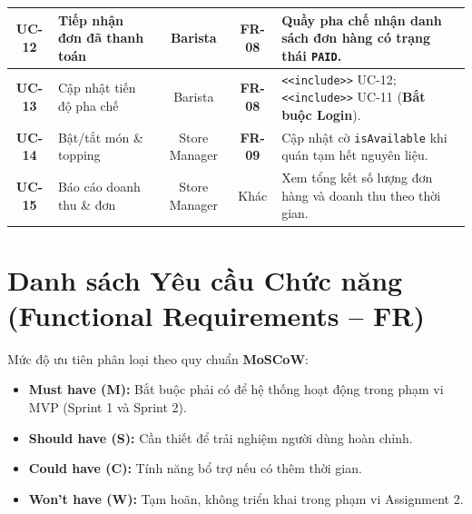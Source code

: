 \documentclass[12pt,a4paper]{article}
\begin{document}
\begin{table}[H]
\begin{tabularx}{\textwidth}{|c|>{\raggedright\arraybackslash}p{3.5cm}|c|c|>{\raggedright\arraybackslash}X|}
\hline
\textbf{UC-12} & Tiếp nhận đơn đã thanh toán & Barista & \textbf{FR-08} & Quầy pha chế nhận danh sách đơn hàng có trạng thái \texttt{PAID}. \\
\hline
\textbf{UC-13} & Cập nhật tiến độ pha chế & Barista & \textbf{FR-08} & \texttt{<<include>>} UC-12; \texttt{<<include>>} UC-11 (\textbf{Bắt buộc Login}). \\
\hline
\textbf{UC-14} & Bật/tắt món \& topping & Store Manager & \textbf{FR-09} & Cập nhật cờ \texttt{isAvailable} khi quán tạm hết nguyên liệu. \\
\hline
\textbf{UC-15} & Báo cáo doanh thu \& đơn & Store Manager & Khác & Xem tổng kết số lượng đơn hàng và doanh thu theo thời gian. \\
\hline
\end{tabularx}
\end{table}

\newpage

\section{Danh sách Yêu cầu Chức năng (Functional Requirements -- FR)}

Mức độ ưu tiên phân loại theo quy chuẩn \textbf{MoSCoW}:
\begin{itemize}[itemsep=1pt]
    \item \textbf{Must have (M):} Bắt buộc phải có để hệ thống hoạt động trong phạm vi MVP (Sprint 1 và Sprint 2).
    \item \textbf{Should have (S):} Cần thiết để trải nghiệm người dùng hoàn chỉnh.
    \item \textbf{Could have (C):} Tính năng bổ trợ nếu có thêm thời gian.
    \item \textbf{Won't have (W):} Tạm hoãn, không triển khai trong phạm vi Assignment 2.
\end{itemize}
\end{document}
